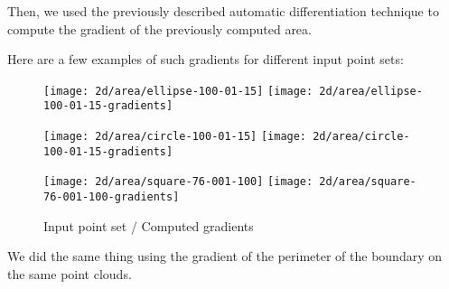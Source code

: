 Then, we used the previously described automatic differentiation technique to
compute the gradient of the previously computed area.

Here are a few examples of such gradients for different input point sets:

\begin{figure}[H]
    \centering

    \begin{minipage}{0.8\linewidth}
        \centering
        \texttt{[image: 2d/area/ellipse-100-01-15]}
        \texttt{[image: 2d/area/ellipse-100-01-15-gradients]}
        \label{fig:gradients_area_2d_ellipse}
    \end{minipage}

    \begin{minipage}{0.8\linewidth}
        \centering
        \texttt{[image: 2d/area/circle-100-01-15]}
        \texttt{[image: 2d/area/circle-100-01-15-gradients]}
        \label{fig:gradients_area_2d_circle}
    \end{minipage}

    \begin{minipage}{0.8\linewidth}
        \centering
        \texttt{[image: 2d/area/square-76-001-100]}
        \texttt{[image: 2d/area/square-76-001-100-gradients]}
        \label{fig:gradients_area_2d_square}
    \end{minipage}

    \caption{Input point set / Computed gradients}
    \label{fig:gradients_area_2d}
\end{figure}

We did the same thing using the gradient of the perimeter of the boundary on the
same point clouds.

